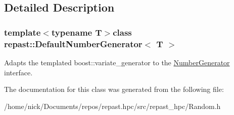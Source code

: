 \subsection{Detailed Description}
\subsubsection*{template$<$typename T$>$class repast\-::\-Default\-Number\-Generator$<$ T $>$}

Adapts the templated boost\-::variate\-\_\-generator to the \hyperlink{classrepast_1_1_number_generator}{Number\-Generator} interface. 

The documentation for this class was generated from the following file\-:\begin{DoxyCompactItemize}
\item 
/home/nick/\-Documents/repos/repast.\-hpc/src/repast\-\_\-hpc/Random.\-h\end{DoxyCompactItemize}
